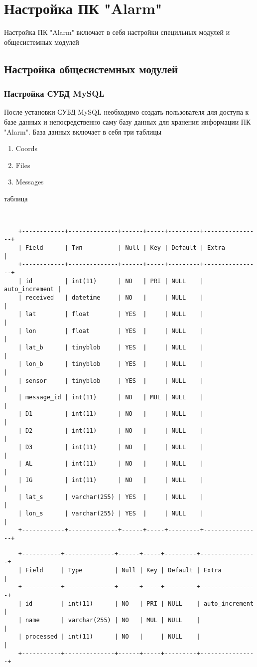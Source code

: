 \documentclass[12pt]{article}[a4paper,14pt,russian]
\begin{document}
	\section {Настройка ПК "Alarm"}
	Настройка ПК "Alarm" включает в себя настройки специльных модулей и общесистемных модулей
	\subsection {Настройка общесистемных модулей}
	\subsubsection {Настройка СУБД MySQL}
	После установки СУБД MySQL необходимо создать пользователя для доступа к базе данных и непосредственно саму базу данных для хранения информации ПК "Alarm". База данных включает в себя три таблицы
	\begin{enumerate}
		\item Coords
		\item Files
		\item Messages
	\end{enumerate} 
	таблица
	\begin{verbatim}
	
	
	+------------+--------------+------+-----+---------+----------------+
	| Field      | Тип          | Null | Key | Default | Extra          |
	+------------+--------------+------+-----+---------+----------------+
	| id         | int(11)      | NO   | PRI | NULL    | auto_increment |
	| received   | datetime     | NO   |     | NULL    |                |
	| lat        | float        | YES  |     | NULL    |                |
	| lon        | float        | YES  |     | NULL    |                |
	| lat_b      | tinyblob     | YES  |     | NULL    |                |
	| lon_b      | tinyblob     | YES  |     | NULL    |                |
	| sensor     | tinyblob     | YES  |     | NULL    |                |
	| message_id | int(11)      | NO   | MUL | NULL    |                |
	| D1         | int(11)      | NO   |     | NULL    |                |
	| D2         | int(11)      | NO   |     | NULL    |                |
	| D3         | int(11)      | NO   |     | NULL    |                |
	| AL         | int(11)      | NO   |     | NULL    |                |
	| IG         | int(11)      | NO   |     | NULL    |                |
	| lat_s      | varchar(255) | YES  |     | NULL    |                |
	| lon_s      | varchar(255) | YES  |     | NULL    |                |
	+------------+--------------+------+-----+---------+----------------+
	\end{verbatim}
	\begin{verbatim}
	+-----------+--------------+------+-----+---------+----------------+
	| Field     | Type         | Null | Key | Default | Extra          |
	+-----------+--------------+------+-----+---------+----------------+
	| id        | int(11)      | NO   | PRI | NULL    | auto_increment |
	| name      | varchar(255) | NO   | MUL | NULL    |                |
	| processed | int(11)      | NO   |     | NULL    |                |
	+-----------+--------------+------+-----+---------+----------------+
	\end{verbatim}
	
\end{document}
